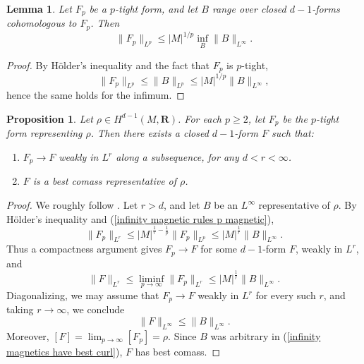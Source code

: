 \documentclass[reqno,11pt]{amsart}
\newcommand{\RR}{\mathbf{R}}
\newtheorem{lemma}[theorem]{Lemma}
\newtheorem{proposition}[theorem]{Proposition}
\theoremstyle{definition}
\numberwithin{equation}{section}
\begin{document}
\begin{lemma}
Let $F_p$ be a $p$-tight form, and let $B$ range over closed $d - 1$-forms cohomologous to $F_p$. Then
\begin{equation}\label{infinity magnetic rules p magnetic}
	\|F_p\|_{L^p} \leq |M|^{1/p} \inf_B \|B\|_{L^\infty}.
\end{equation}
\end{lemma}
\begin{proof}
By H\"older's inequality and the fact that $F_p$ is $p$-tight,
$$\|F_p\|_{L^p} \leq \|B\|_{L^p} \leq |M|^{1/p} \|B\|_{L^\infty},$$
hence the same holds for the infimum.
\end{proof}

\begin{proposition}\label{existence infinity}
Let $\rho \in H^{d - 1}(M, \RR)$.
For each $p \geq 2$, let $F_p$ be the $p$-tight form representing $\rho$. Then there exists a closed $d - 1$-form $F$ such that:
\begin{enumerate}
\item $F_p \to F$ weakly in $L^r$ along a subsequence, for any $d < r < \infty$.
\item $F$ is a best comass representative of $\rho$.
\end{enumerate}
\end{proposition}
\begin{proof}
We roughly follow \cite[\S3]{Lindqvist14}.
Let $r > d$, and let $B$ be an $L^\infty$ representative of $\rho$.
By H\"older's inequality and (\ref{infinity magnetic rules p magnetic}),
\begin{equation}\label{uniform bounds in p by best curl}
	\|F_p\|_{L^r} \leq |M|^{\frac{1}{r} - \frac{1}{p}} \|F_p\|_{L^p} \leq |M|^{\frac{1}{r}} \|B\|_{L^\infty}.
\end{equation}
Thus a compactness argument gives $F_p \to F$ for some $d - 1$-form $F$, weakly in $L^r$, and 
$$\|F\|_{L^r} \leq \liminf_{p \to \infty} \|F_p\|_{L^r} \leq |M|^{\frac{1}{r}} \|B\|_{L^\infty}.$$
Diagonalizing, we may assume that $F_p \to F$ weakly in $L^r$ for every such $r$, and taking $r \to \infty$, we conclude 
\begin{equation}\label{infinity magnetics have best curl}
	\|F\|_{L^\infty} \leq \|B\|_{L^\infty}.
\end{equation}
Moreover, $[F] = \lim_{p \to \infty} [F_p] = \rho$.
Since $B$ was arbitrary in (\ref{infinity magnetics have best curl}), $F$ has best comass.
\end{proof}
\end{document}
